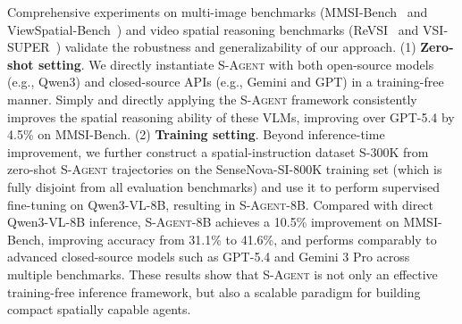 Comprehensive experiments on multi-image benchmarks (MMSI-Bench~\citep{mmsi_bench} and ViewSpatial-Bench~\citep{viewspatial_bench}) and video spatial reasoning benchmarks (ReVSI~\citep{revsi} and VSI-SUPER~\citep{cambrian_s}) validate the robustness and generalizability of our approach.
% 
(1) \textbf{Zero-shot setting}. We directly instantiate \textsc{S-Agent} with both open-source models (e.g., Qwen3) and closed-source APIs (e.g., Gemini and GPT) in a training-free manner. 
Simply and directly applying the \textsc{S-Agent} framework consistently improves the spatial reasoning ability of these VLMs, improving over GPT-5.4 by 4.5\% on MMSI-Bench. 
% 
(2) \textbf{Training setting}. Beyond inference-time improvement, we further construct a spatial-instruction dataset \textsc{S-300K} from zero-shot \textsc{S-Agent} trajectories on the SenseNova-SI-800K \citep{sensenova_si} training set (which is fully disjoint from all evaluation benchmarks) and use it to perform supervised fine-tuning on Qwen3-VL-8B, resulting in \textsc{S-Agent-8B}. 
% 
Compared with direct Qwen3-VL-8B inference, \textsc{S-Agent-8B} achieves a 10.5\% improvement on MMSI-Bench, improving accuracy from 31.1\% to 41.6\%, and performs comparably to advanced closed-source models such as GPT-5.4 and Gemini 3 Pro across multiple benchmarks. 
% 
These results show that \textsc{S-Agent} is not only an effective training-free inference framework, but also a scalable paradigm for building compact spatially capable agents.
